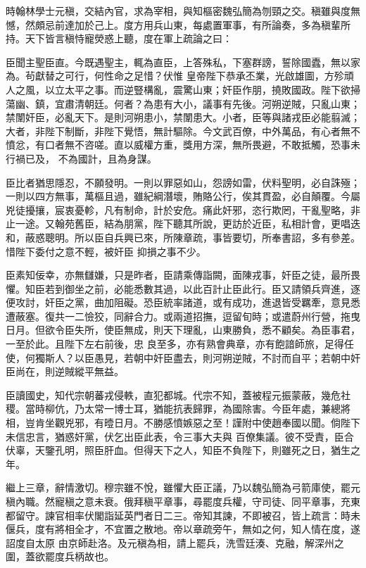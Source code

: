 \begin{pinyinscope}
 時翰林學士元稹，交結內官，求為宰相，與知樞密魏弘簡為刎頸之交。稹雖與度無憾，然頗忌前達加於己上。度方用兵山東，每處置軍事，有所論奏，多為稹輩所持。天下皆言稹恃寵熒惑上聽，度在軍上疏論之曰：



 臣聞主聖臣直。今既遇聖主，輒為直臣，上答殊私，下塞群謗，誓除國蠹，無以家為。茍獻替之可行，何性命之足惜？伏惟
 皇帝陛下恭承丕業，光啟雄圖，方殄頑人之風，以立太平之事。而逆豎構亂，震驚山東；奸臣作朋，撓敗國政。陛下欲掃蕩幽、鎮，宜肅清朝廷。何者？為患有大小，議事有先後。河朔逆賊，只亂山東；禁闈奸臣，必亂天下。是則河朔患小，禁闈患大。小者，臣等與諸戎臣必能翦滅；大者，非陛下制斷，非陛下覺悟，無計驅除。今文武百僚，中外萬品，有心者無不憤忿，有口者無不咨嗟。直以威權方重，獎用方深，無所畏避，不敢抵觸，恐事未行禍已及，
 不為國計，且為身謀。



 臣比者猶思隱忍，不願發明。一則以罪惡如山，怨謗如雷，伏料聖明，必自誅殛；一則以四方無事，萬樞且過，雖紀綱潛壞，賄賂公行，俟其貫盈，必自顛覆。今屬兇徒擾攘，宸衷憂軫，凡有制命，計於安危。痛此奸邪，恣行欺罔，干亂聖略，非止一途。又翰苑舊臣，結為朋黨，陛下聽其所說，更訪於近臣，私相計會，更唱迭和，蔽惑聰明。所以臣自兵興已來，所陳章疏，事皆要切，所奉書詔，多有參差。惜陛下委付之意不輕，被奸臣
 抑損之事不少。



 臣素知佞幸，亦無讎嫌，只是昨者，臣請乘傳詣闕，面陳戎事，奸臣之徒，最所畏懼。知臣若到御坐之前，必能悉數其過，以此百計止臣此行。臣又請領兵齊進，逐便攻討，奸臣之黨，曲加阻礙。恐臣統率諸道，或有成功，進退皆受羈牽，意見悉遭蔽塞。復共一二憸狡，同辭合力。或兩道招撫，逗留旬時；或遣蔚州行營，拖曳日月。但欲令臣失所，使臣無成，則天下理亂，山東勝負，悉不顧矣。為臣事君，一至於此。且陛下左右前後，忠
 良至多，亦有熟會典章，亦有飽諳師旅，足得任使，何獨斯人？以臣愚見，若朝中奸臣盡去，則河朔逆賊，不討而自平；若朝中奸臣尚在，則逆賊縱平無益。



 臣讀國史，知代宗朝蕃戎侵軼，直犯都城。代宗不知，蓋被程元振蒙蔽，幾危社稷。當時柳伉，乃太常一博士耳，猶能抗表歸罪，為國除害。今臣年處，兼總將相，豈肯坐觀兇邪，有曀日月。不勝感憤嫉惡之至！謹附中使趙奉國以聞。倘陛下未信忠言，猶惑奸黨，伏乞出臣此表，令三事大夫與
 百僚集議。彼不受責，臣合伏辜，天鑒孔明，照臣肝血。但得天下之人，知臣不負陛下，則雖死之日，猶生之年。



 繼上三章，辭情激切。穆宗雖不悅，雖懼大臣正議，乃以魏弘簡為弓箭庫使，罷元稹內職。然寵稹之意未衰。俄拜稹平章事，尋罷度兵權，守司徒、同平章事，充東都留守。諫官相率伏閣詣延英門者日二三。帝知其諫，不即被召，皆上疏言：時未偃兵，度有將相全才，不宜置之散地。帝以章疏旁午，無如之何，知人情在度，遂詔度自太原
 由京師赴洛。及元稹為相，請上罷兵，洗雪廷湊、克融，解深州之圍，蓋欲罷度兵柄故也。




\end{pinyinscope}
